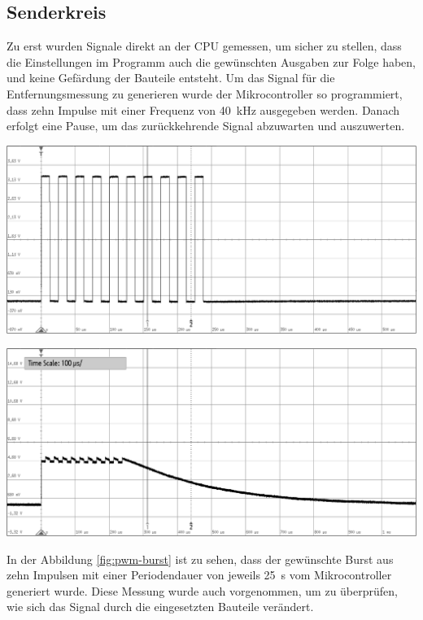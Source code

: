 \subsection{Senderkreis}
Zu erst wurden Signale direkt an der CPU gemessen, um sicher zu stellen, dass die Einstellungen im Programm auch die gewünschten Ausgaben zur Folge haben, und keine Gefärdung der Bauteile entsteht.
Um das Signal für die Entfernungsmessung zu generieren wurde der Mikrocontroller so programmiert, dass zehn Impulse mit einer Frequenz von 40~kHz ausgegeben werden. Danach erfolgt eine Pause, um das zurückkehrende Signal abzuwarten und auszuwerten.\\
\begin{minipage}{0.5\textwidth}
\includegraphics[width=1\textwidth%
]{Abbildungen/MessungenP1/PWM-von-der-cpu.png}
\label{fig:pwm-burst}
\end{minipage}
\begin{minipage}{0.5\textwidth}
\includegraphics[width=1\textwidth%
]{Abbildungen/MessungenP1/PWM-ausgabe-mit-Hi-Side.png}
\label{fig:HiSide}
\end{minipage}
In der Abbildung \ref{fig:pwm-burst} ist zu sehen, dass der gewünschte Burst aus zehn Impulsen mit einer Periodendauer von jeweils 25~\textmu s vom Mikrocontroller generiert wurde. Diese Messung wurde auch vorgenommen, um zu überprüfen, wie sich das Signal durch die eingesetzten Bauteile verändert.\\
